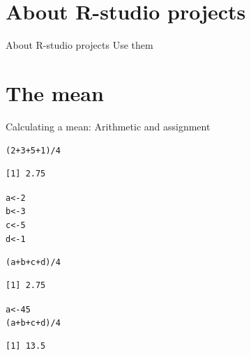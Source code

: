 \documentclass[10pt]{beamer}\usepackage[]{graphicx}\usepackage[]{color}
\makeatletter
\newcommand{\hlnum}[1]{\textcolor[rgb]{0.686,0.059,0.569}{#1}}%
\newcommand{\hlopt}[1]{\textcolor[rgb]{0,0,0}{#1}}%
\newcommand{\hlstd}[1]{\textcolor[rgb]{0.345,0.345,0.345}{#1}}%
\newcommand{\hlkwb}[1]{\textcolor[rgb]{0.69,0.353,0.396}{#1}}%
\newenvironment{kframe}{%
 \def\at@end@of@kframe{}%
 \ifinner\ifhmode%
  \def\at@end@of@kframe{\end{minipage}}%
  \begin{minipage}{\columnwidth}%
 \fi\fi%
 \def\FrameCommand##1{\hskip\@totalleftmargin \hskip-\fboxsep
 \colorbox{shadecolor}{##1}\hskip-\fboxsep
     \hskip-\linewidth \hskip-\@totalleftmargin \hskip\columnwidth}%
 \MakeFramed {\advance\hsize-\width
   \@totalleftmargin\z@ \linewidth\hsize
   \@setminipage}}%
 {\par\unskip\endMakeFramed%
 \at@end@of@kframe}
\newenvironment{knitrout}{}{} %
\makeatother
\begin{document}

\section{About R-studio projects}

\begin{frame}{About R-studio projects}
Use them
\end{frame}

\section{The mean}

\begin{frame}[fragile]{Calculating a mean: Arithmetic and assignment}

\begin{knitrout}
\color{fgcolor}\begin{kframe}
\begin{alltt}
  \hlstd{(}\hlnum{2} \hlopt{+} \hlnum{3} \hlopt{+} \hlnum{5} \hlopt{+} \hlnum{1}\hlstd{)} \hlopt{/} \hlnum{4}
\end{alltt}
\begin{verbatim}
[1] 2.75
\end{verbatim}
\end{kframe}
\end{knitrout}
\pause
\begin{knitrout}
\color{fgcolor}\begin{kframe}
\begin{alltt}
  \hlstd{a} \hlkwb{<-} \hlnum{2}
  \hlstd{b} \hlkwb{<-} \hlnum{3}
  \hlstd{c} \hlkwb{<-} \hlnum{5}
  \hlstd{d} \hlkwb{<-} \hlnum{1}

  \hlstd{(a} \hlopt{+} \hlstd{b} \hlopt{+} \hlstd{c} \hlopt{+} \hlstd{d)} \hlopt{/} \hlnum{4}
\end{alltt}
\begin{verbatim}
[1] 2.75
\end{verbatim}
\end{kframe}
\end{knitrout}
\pause
\begin{knitrout}
\color{fgcolor}\begin{kframe}
\begin{alltt}
  \hlstd{a} \hlkwb{<-} \hlnum{45}
  \hlstd{(a} \hlopt{+} \hlstd{b} \hlopt{+} \hlstd{c} \hlopt{+} \hlstd{d)} \hlopt{/} \hlnum{4}
\end{alltt}
\begin{verbatim}
[1] 13.5
\end{verbatim}
\end{kframe}
\end{knitrout}
\end{frame}
\end{document}
